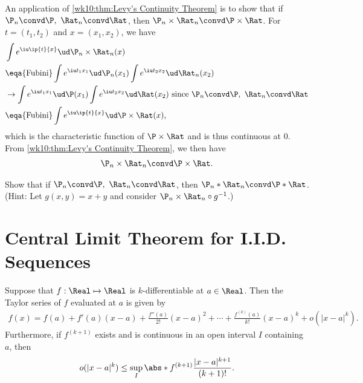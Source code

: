 \documentclass[../aipt.tex]{subfiles}
\begin{document}
An application of \cref{wk10:thm:Levy's Continuity Theorem} is to show that if $\P_n\convd\P,\ \Rat_n\convd\Rat$, then $\P_n \times \Rat_n \convd \P \times \Rat$. For $t=(t_1,t_2)$ and $x=(x_1,x_2)$, we have
\begin{align*}
& \int e^{\iu \ip{t}{x}} \ud \P_n \times \Rat_n(x) \\
& \eqa{\text{Fubini}} \int e^{\iu t_1x_1} \ud \P_n(x_1) \int e^{\iu t_2x_2} \ud \Rat_n(x_2) \\
& \to \int e^{\iu t_1x_1} \ud \P(x_1) \int e^{\iu t_2x_2} \ud \Rat(x_2) \text{ since $\P_n\convd\P,\ \Rat_n\convd\Rat$}\\
& \eqa{\text{Fubini}} \int e^{\iu \ip{t}{x}} \ud \P \times \Rat(x), 
\end{align*}
which is the characteristic function of $\P \times \Rat$ and is thus continuous at 0. From \cref{wk10:thm:Levy's Continuity Theorem}, we then have
\begin{align*}
\P_n \times \Rat_n \convd \P \times \Rat.
\end{align*}

\begin{Exercise}\label{wk10:ex:P*Q}
Show that if $\P_n\convd\P,\ \Rat_n\convd\Rat$, then $\P_n * \Rat_n \convd \P * \Rat$. (Hint: Let $g(x,y)=x+y$ and consider $\P_n\times\Rat_n \circ g^{-1}$.)
\end{Exercise}

\section{Central Limit Theorem for I.I.D. Sequences}\label{wk10:sec:CLT_IID}

Suppose that $f:\Real \mapsto \Real$ is $k$-differentiable at $a \in \Real$. Then the Taylor series of $f$ evaluated at $a$ is given by 
\begin{align*}
f(x)=f(a)+f'(a)(x-a)+\frac{f''(a)}{2!}(x-a)^2+\cdots+\frac{f^{(k)}(a)}{k!}(x-a)^k+o(|x-a|^k).
\end{align*}
Furthermore, if $f^{(k+1)}$ exists and is continuous in an open interval $I$ containing $a$, then 
\begin{align*}
o(|x-a|^k) \leq \sup_I {\abs*{f^{(k+1)}}\frac{|x-a|^{k+1}}{(k+1)!}}.
\end{align*}
\end{document}
